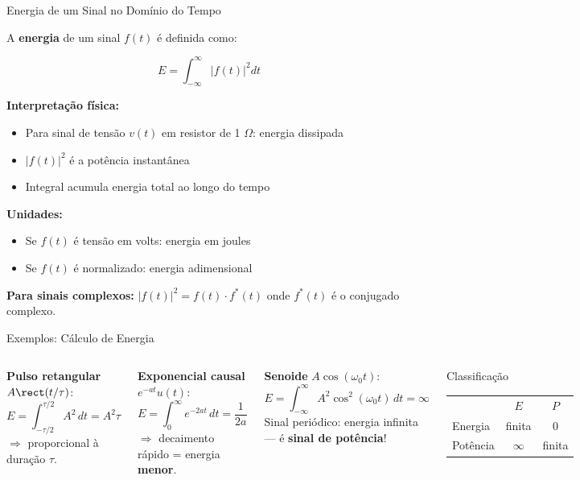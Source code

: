\begin{frame}{Energia de um Sinal no Domínio do Tempo}

A \textbf{energia} de um sinal $f(t)$ é definida como:

\[
E = \int_{-\infty}^{\infty} |f(t)|^2 dt
\]

\textbf{Interpretação física:}

\begin{itemize}
\item Para sinal de tensão $v(t)$ em resistor de 1 $\Omega$: energia dissipada
\item $|f(t)|^2$ é a potência instantânea
\item Integral acumula energia total ao longo do tempo
\end{itemize}

\vspace{0.1cm}

\textbf{Unidades:}

\begin{itemize}
\item Se $f(t)$ é tensão em volts: energia em joules
\item Se $f(t)$ é normalizado: energia adimensional
\end{itemize}

\vspace{0.1cm}

\textbf{Para sinais complexos:} $|f(t)|^2 = f(t) \cdot f^*(t)$ onde $f^*(t)$ é o conjugado complexo.

\end{frame}


\begin{frame}{Exemplos: Cálculo de Energia}

\begin{columns}[T]
\textbf{Pulso retangular} $A\rect(t/\tau)$:
\[
E = \int_{-\tau/2}^{\tau/2} A^2\,dt = A^2\tau
\]
$\Rightarrow$ proporcional à duração $\tau$.

\vspace{0.4cm}

\textbf{Exponencial causal} $e^{-at}u(t)$:
\[
E = \int_0^{\infty} e^{-2at}\,dt = \frac{1}{2a}
\]
$\Rightarrow$ decaimento rápido = energia \textbf{menor}.

\textbf{Senoide} $A\cos(\omega_0 t)$:
\[
E = \int_{-\infty}^{\infty} A^2\cos^2(\omega_0 t)\,dt = \infty
\]
Sinal periódico: energia infinita — é \textbf{sinal de potência}!

\vspace{0.4cm}
\begin{block}{Classificação}
\begin{tabular}{lcc}
 & $E$ & $P$ \\
Energia & finita & $0$ \\
Potência & $\infty$ & finita
\end{tabular}
\end{block}
\end{columns}

\end{frame}

